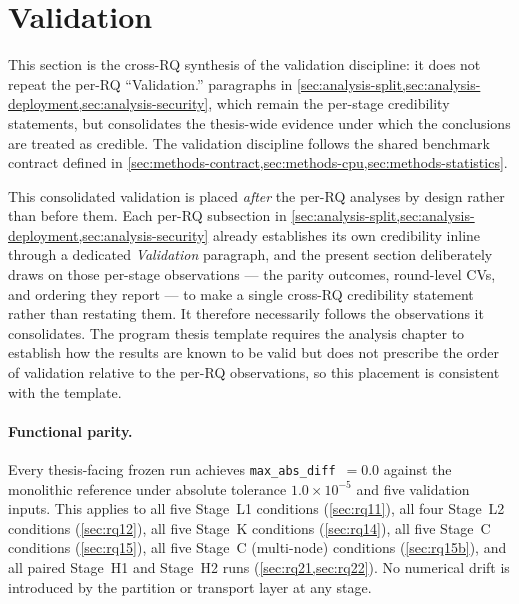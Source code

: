 \section{Validation}
\label{sec:analysis-validation}

This section is the cross-RQ synthesis of the validation discipline: it does
not repeat the per-RQ ``Validation.'' paragraphs in
\cref{sec:analysis-split,sec:analysis-deployment,sec:analysis-security}, which
remain the per-stage credibility statements, but consolidates the
thesis-wide evidence under which the conclusions are treated as credible. The
validation discipline follows the shared benchmark contract defined in
\cref{sec:methods-contract,sec:methods-cpu,sec:methods-statistics}.

This consolidated validation is placed \emph{after} the per-RQ analyses by
design rather than before them. Each per-RQ subsection in
\cref{sec:analysis-split,sec:analysis-deployment,sec:analysis-security} already
establishes its own credibility inline through a dedicated \emph{Validation}
paragraph, and the present section deliberately draws on those per-stage
observations --- the parity outcomes, round-level CVs, and ordering they report
--- to make a single cross-RQ credibility statement rather than restating them.
It therefore necessarily follows the observations it consolidates. The program
thesis template requires the analysis chapter to establish how the results are
known to be valid but does not prescribe the order of validation relative to the
per-RQ observations, so this placement is consistent with the template.

\paragraph{Functional parity.}
Every thesis-facing frozen run achieves
\texttt{max\_abs\_diff}~$=0.0$ against the monolithic reference under absolute
tolerance $1.0 \times 10^{-5}$ and five validation inputs. This applies to all
five Stage~L1 conditions (\cref{sec:rq11}), all four Stage~L2 conditions
(\cref{sec:rq12}), all five Stage~K conditions (\cref{sec:rq14}), all five
Stage~C conditions (\cref{sec:rq15}), all five Stage~C (multi-node) conditions
(\cref{sec:rq15b}), and all paired Stage~H1 and Stage~H2 runs
(\cref{sec:rq21,sec:rq22}). No numerical drift is introduced by the partition
or transport layer at any stage.

